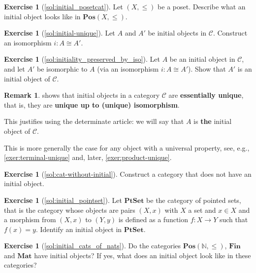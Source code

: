 \documentclass[a4paper,11pt, oneside,titlepage=false]{scrbook}
\theoremstyle{plain}
\theoremstyle{definition}
\newtheorem{rem}[thm]{Remark}
\newtheorem{exer}[thm]{Exercise}
\newcommand{\Cat}[1]{\mathcal{#1}}
\newcommand{\CC}{\Cat{C}}
\newcommand{\Catb}[1]{\mathbf{#1}}
\newcommand{\PTSET}{\Catb{PtSet}}
\newcommand{\POS}{\Catb{Pos}}
\newcommand{\MAT}{\Catb{Mat}}
\newcommand{\SKELFINSET}{\Catb{Fin}}
\newcommand{\NN}{\ensuremath{\mathbb{N}}}
\begin{document}
\begin{exer}[\cref{sol:initial_posetcat}]\label{exer:initial_posetcat}
  Let $(X,\leq)$ be a poset. Describe what an initial object looks like in  $\POS(X,\leq)$.
\end{exer}

\begin{exer}[\cref{sol:initial-unique}]\label{exer:initial-unique}
  Let $A$ and $A'$ be initial objects in $\CC$. Construct an isomorphism $i : A \cong A'$.
\end{exer}

\begin{exer}[\cref{sol:initiality_preserved_by_iso}]\label{exer:initiality_preserved_by_iso}
  Let $A$ be an initial object in $\CC$, and let $A'$ be isomorphic to $A$ (via an isomorphism $i : A \cong A'$).
  Show that $A'$ is an initial object of $\CC$.
\end{exer}

\begin{rem}
   shows that initial objects in a category $\CC$ are \textbf{essentially unique}, that is, they are \textbf{unique up to (unique) isomorphism}.


  This justifies using the determinate article: we will say that $A$ is \textbf{the} initial object of $\CC$.


  This is more generally the case for any object with a universal property, see, e.g., \cref{exer:terminal-unique} and, later, \cref{exer:product-unique}.
\end{rem}

\begin{exer}[\cref{sol:cat-without-initial}]\label{exer:cat-without-initial}
  Construct a category that does not have an initial object.
\end{exer}

\begin{exer}[\cref{sol:initial_pointset}]\label{exer:initial_pointset} Let $\PTSET$ be the category of pointed sets, that is the category whose objects are pairs $(X,x)$ with $X$ a set and $x\in X$ and a morphism from $(X,x)$ to $(Y,y)$ is defined as a function $f:X\to Y$ such that $f(x)=y$. Identify an initial object in $\PTSET$.
\end{exer}

\begin{exer}[\cref{sol:initial_cats_of_nats}]\label{exer:initial_cats_of_nats}
Do the categories $\POS(\NN, \leq)$, $\SKELFINSET$ and $\MAT$ have initial objects? If yes, what does an initial object look like in these categories?
\end{exer}
\end{document}
